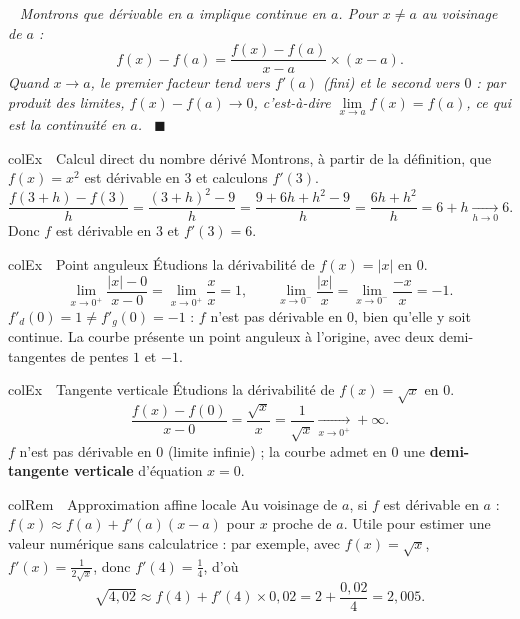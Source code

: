 \documentclass[11pt,a4paper]{article}
\newenvironment{exemple}[1][Exemple]
  {\begin{fiche}{colEx}{\ding{217}~~#1}}{\end{fiche}}
\newenvironment{remarque}[1][Remarque]
  {\begin{fiche}{colRem}{\ding{43}~~#1}}{\end{fiche}}
\newenvironment{demo}
  {\par\smallskip\noindent{\sffamily\bfseries\color{qtealdark}Démonstration.}\ \itshape}
  {\ \normalfont\hfill$\blacksquare$\par\medskip}
\begin{document}
\begin{demo}
Montrons que dérivable en $a$ implique continue en $a$. Pour $x \neq a$ au voisinage de $a$ :
\[
  f(x) - f(a) = \frac{f(x) - f(a)}{x - a} \times (x - a).
\]
Quand $x \to a$, le premier facteur tend vers $f'(a)$ (fini) et le second vers $0$ : par produit des limites, $f(x) - f(a) \to 0$, c'est-à-dire $\lim\limits_{x \to a} f(x) = f(a)$, ce qui est la continuité en $a$.
\end{demo}

\begin{exemple}[Calcul direct du nombre dérivé]
Montrons, à partir de la définition, que $f(x) = x^2$ est dérivable en $3$ et calculons $f'(3)$.
\[
  \frac{f(3 + h) - f(3)}{h} = \frac{(3+h)^2 - 9}{h} = \frac{9 + 6h + h^2 - 9}{h} = \frac{6h + h^2}{h} = 6 + h
  \xrightarrow[h \to 0]{} 6.
\]
Donc $f$ est dérivable en $3$ et $f'(3) = 6$.
\end{exemple}

\begin{exemple}[Point anguleux]
Étudions la dérivabilité de $f(x) = |x|$ en $0$.
\[
  \lim_{x \to 0^+} \frac{|x| - 0}{x - 0} = \lim_{x \to 0^+} \frac{x}{x} = 1,
  \qquad
  \lim_{x \to 0^-} \frac{|x|}{x} = \lim_{x \to 0^-} \frac{-x}{x} = -1.
\]
$f'_d(0) = 1 \neq f'_g(0) = -1$ : $f$ n'est pas dérivable en $0$, bien qu'elle y soit continue. La courbe présente un point anguleux à l'origine, avec deux demi-tangentes de pentes $1$ et $-1$.
\end{exemple}

\begin{exemple}[Tangente verticale]
Étudions la dérivabilité de $f(x) = \sqrt{x}$ en $0$.
\[
  \frac{f(x) - f(0)}{x - 0} = \frac{\sqrt{x}}{x} = \frac{1}{\sqrt{x}} \xrightarrow[x \to 0^+]{} +\infty.
\]
$f$ n'est pas dérivable en $0$ (limite infinie) ; la courbe admet en $0$ une \textbf{demi-tangente verticale} d'équation $x = 0$.
\end{exemple}

\begin{remarque}[Approximation affine locale]
Au voisinage de $a$, si $f$ est dérivable en $a$ : $f(x) \approx f(a) + f'(a)(x - a)$ pour $x$ proche de $a$. Utile pour estimer une valeur numérique sans calculatrice : par exemple, avec $f(x) = \sqrt{x}$, $f'(x) = \frac{1}{2\sqrt{x}}$, donc $f'(4) = \frac{1}{4}$, d'où
\[
  \sqrt{4{,}02} \approx f(4) + f'(4)\times 0{,}02 = 2 + \frac{0{,}02}{4} = 2{,}005.
\]
\end{remarque}

\end{document}
